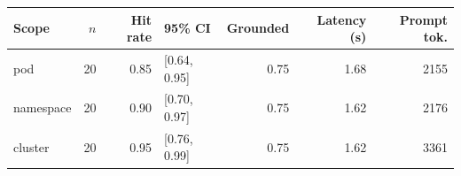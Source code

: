 \begin{tabular}{lrrlrrr}
\toprule
Scope & $n$ & Hit rate & 95\% CI & Grounded & Latency (s) & Prompt tok. \\
\midrule
pod & 20 & 0.85 & [0.64, 0.95] & 0.75 & 1.68 & 2155 \\
namespace & 20 & 0.90 & [0.70, 0.97] & 0.75 & 1.62 & 2176 \\
cluster & 20 & 0.95 & [0.76, 0.99] & 0.75 & 1.62 & 3361 \\
\bottomrule
\end{tabular}
